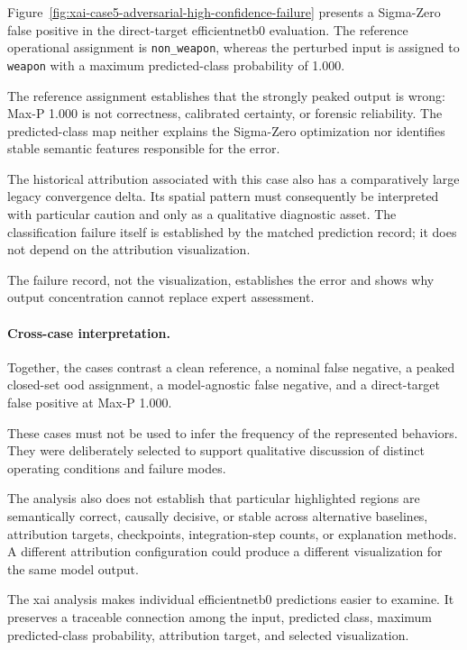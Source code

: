 Figure~\ref{fig:xai-case5-adversarial-high-confidence-failure} presents a
Sigma-Zero false positive in the direct-target \gls{efficientnetb0} evaluation. The
reference operational assignment is \texttt{non\_weapon}, whereas the
perturbed input is assigned to \texttt{weapon} with a maximum predicted-class
probability of 1.000.

The reference assignment establishes that the strongly peaked output is wrong:
Max-P 1.000 is not correctness, calibrated certainty, or forensic reliability.
The predicted-class map neither explains the Sigma-Zero optimization nor
identifies stable semantic features responsible for the error.

The historical attribution associated with this case also has a comparatively
large legacy convergence delta. Its spatial pattern must consequently be
interpreted with particular caution and only as a qualitative diagnostic asset.
The classification failure itself is established by the matched prediction
record; it does not depend on the attribution visualization.

The failure record, not the visualization, establishes the error and shows why
output concentration cannot replace expert assessment.

\paragraph{Cross-case interpretation.}

Together, the cases contrast a clean reference, a nominal false negative, a
peaked closed-set \gls{ood} assignment, a model-agnostic false negative, and a
direct-target false positive at Max-P 1.000.

These cases must not be used to infer the frequency of the represented
behaviors. They were deliberately selected to support qualitative discussion
of distinct operating conditions and failure modes.

The analysis also does not establish that particular highlighted regions are
semantically correct, causally decisive, or stable across alternative
baselines, attribution targets, checkpoints, integration-step counts, or
explanation methods. A different attribution configuration could produce a
different visualization for the same model output.

The \gls{xai} analysis makes individual \gls{efficientnetb0} predictions
easier to examine. It preserves a traceable connection
among the input, predicted class, maximum predicted-class probability,
attribution target, and selected visualization.

